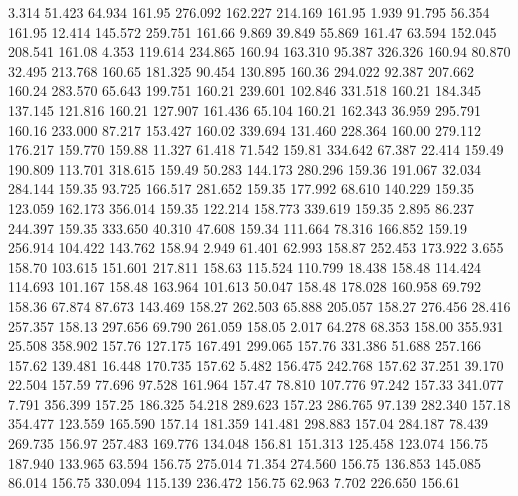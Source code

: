    3.314   51.423   64.934       161.95
 276.092  162.227  214.169       161.95
   1.939   91.795   56.354       161.95
  12.414  145.572  259.751       161.66
   9.869   39.849   55.869       161.47
  63.594  152.045  208.541       161.08
   4.353  119.614  234.865       160.94
 163.310   95.387  326.326       160.94
  80.870   32.495  213.768       160.65
 181.325   90.454  130.895       160.36
 294.022   92.387  207.662       160.24
 283.570   65.643  199.751       160.21
 239.601  102.846  331.518       160.21
 184.345  137.145  121.816       160.21
 127.907  161.436   65.104       160.21
 162.343   36.959  295.791       160.16
 233.000   87.217  153.427       160.02
 339.694  131.460  228.364       160.00
 279.112  176.217  159.770       159.88
  11.327   61.418   71.542       159.81
 334.642   67.387   22.414       159.49
 190.809  113.701  318.615       159.49
  50.283  144.173  280.296       159.36
 191.067   32.034  284.144       159.35
  93.725  166.517  281.652       159.35
 177.992   68.610  140.229       159.35
 123.059  162.173  356.014       159.35
 122.214  158.773  339.619       159.35
   2.895   86.237  244.397       159.35
 333.650   40.310   47.608       159.34
 111.664   78.316  166.852       159.19
 256.914  104.422  143.762       158.94
   2.949   61.401   62.993       158.87
 252.453  173.922    3.655       158.70
 103.615  151.601  217.811       158.63
 115.524  110.799   18.438       158.48
 114.424  114.693  101.167       158.48
 163.964  101.613   50.047       158.48
 178.028  160.958   69.792       158.36
  67.874   87.673  143.469       158.27
 262.503   65.888  205.057       158.27
 276.456   28.416  257.357       158.13
 297.656   69.790  261.059       158.05
   2.017   64.278   68.353       158.00
 355.931   25.508  358.902       157.76
 127.175  167.491  299.065       157.76
 331.386   51.688  257.166       157.62
 139.481   16.448  170.735       157.62
   5.482  156.475  242.768       157.62
  37.251   39.170   22.504       157.59
  77.696   97.528  161.964       157.47
  78.810  107.776   97.242       157.33
 341.077    7.791  356.399       157.25
 186.325   54.218  289.623       157.23
 286.765   97.139  282.340       157.18
 354.477  123.559  165.590       157.14
 181.359  141.481  298.883       157.04
 284.187   78.439  269.735       156.97
 257.483  169.776  134.048       156.81
 151.313  125.458  123.074       156.75
 187.940  133.965   63.594       156.75
 275.014   71.354  274.560       156.75
 136.853  145.085   86.014       156.75
 330.094  115.139  236.472       156.75
  62.963    7.702  226.650       156.61
